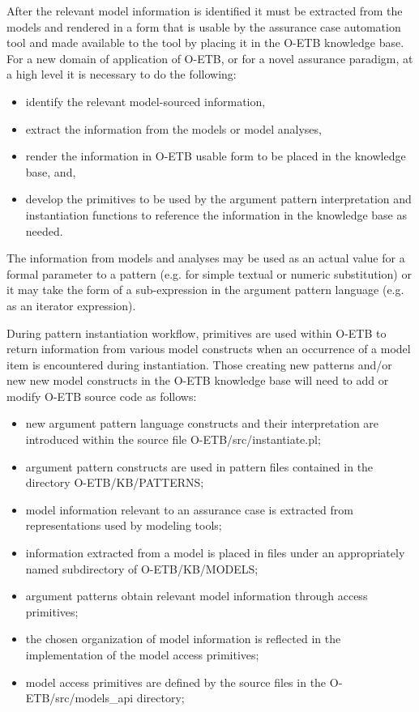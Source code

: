 \documentclass[12pt,twoside,a4paper]{article}
\begin{document}
After the relevant model information is identified it must be extracted from the models and rendered in a form that is usable by the assurance case automation tool and made available to the tool by placing it in the O-ETB knowledge base.
For a new domain of application of O-ETB, or for a novel assurance paradigm, at a high level it is necessary to do the following:
\begin{itemize}
    \item identify the relevant model-sourced information,
    \item extract the information from the models or model analyses,
    \item render the information in O-ETB usable form to be placed in the knowledge base, and,
    \item develop the primitives to be used by the argument pattern interpretation and instantiation functions to reference the information in the knowledge base as needed.
\end{itemize}
The information from models and analyses may be used as an actual value for a formal parameter to a pattern (e.g. for simple textual or numeric substitution) or it may take the form of a sub-expression in the argument pattern language (e.g. as an iterator expression).

During pattern instantiation workflow, primitives are used within O-ETB to return information from various model constructs when an occurrence of a model item is encountered during instantiation.
Those creating new patterns and/or new new model constructs in the O-ETB knowledge base will need to add or modify O-ETB source code as follows:
\begin{itemize}
    \item new argument pattern language constructs and their interpretation are introduced within the source file O-ETB/src/instantiate.pl;
    \item argument pattern constructs are used in pattern files contained in the directory O-ETB/KB/PATTERNS;
    \item model information relevant to an assurance case is extracted from representations used by modeling tools;
    \item information extracted from a model is placed in files under an appropriately named subdirectory of O-ETB/KB/MODELS;
    \item argument patterns obtain relevant model information through access primitives;
    \item the chosen organization of model information is reflected in the implementation of the model access primitives;
    \item model access primitives are defined by the source files in the O-ETB/src/models\_api directory;
\end{itemize}
\end{document}
